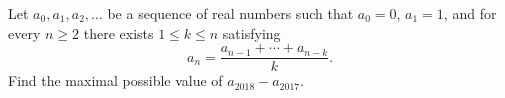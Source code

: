 Let $a_0, a_1, a_2, \ldots$ be a sequence of real numbers such that $a_0 = 0$, $a_1 = 1$, and for every $n \geq 2$ there exists $1 \leq k \leq n$ satisfying
\[ a_n = \frac{a_{n-1} + \cdots + a_{n-k}}{k}. \]
Find the maximal possible value of $a_{2018} - a_{2017}$.

